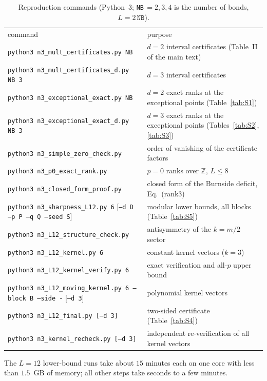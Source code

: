 \documentclass[aps,prx,reprint,superscriptaddress,nobibnotes,longbibliography]{revtex4-2}
\begin{document}
\begin{table}[t]
\caption{Reproduction commands (Python~3; \texttt{NB}$\,=2,3,4$ is the number of bonds, $L=2\,\texttt{NB}$).}
\label{tab:S9}
\footnotesize
\begin{ruledtabular}
\begin{tabular}{ll}
command & purpose\\
\colrule
\texttt{python3 n3\_mult\_certificates.py NB} & $d=2$ interval certificates (Table~II of the main text)\\
\texttt{python3 n3\_mult\_certificates\_d.py NB 3} & $d=3$ interval certificates\\
\texttt{python3 n3\_exceptional\_exact.py NB} & $d=2$ exact ranks at the exceptional points (Table~\ref{tab:S1})\\
\texttt{python3 n3\_exceptional\_exact\_d.py NB 3} & $d=3$ exact ranks at the exceptional points (Tables~\ref{tab:S2}, \ref{tab:S3})\\
\texttt{python3 n3\_simple\_zero\_check.py} & order of vanishing of the certificate factors\\
\texttt{python3 n3\_p0\_exact\_rank.py} & $p=0$ ranks over $\mathbb Z$, $L\le8$\\
\texttt{python3 n3\_closed\_form\_proof.py} & closed form of the Burnside deficit, Eq.~(rank3)\\
\texttt{python3 n3\_sharpness\_L12.py 6} [\texttt{--d D --p P --q Q --seed S}] & modular lower bounds, all blocks (Table~\ref{tab:S5})\\
\texttt{python3 n3\_L12\_structure\_check.py} & antisymmetry of the $k=m/2$ sector\\
\texttt{python3 n3\_L12\_kernel.py 6} & constant kernel vectors ($k=3$)\\
\texttt{python3 n3\_L12\_kernel\_verify.py 6} & exact verification and all-$p$ upper bound\\
\texttt{python3 n3\_L12\_moving\_kernel.py 6 --block B --side -} [\texttt{--d 3}] & polynomial kernel vectors\\
\texttt{python3 n3\_L12\_final.py [--d 3]} & two-sided certificate (Table~\ref{tab:S4})\\
\texttt{python3 n3\_kernel\_recheck.py [--d 3]} & independent re-verification of all kernel vectors\\
\end{tabular}
\end{ruledtabular}
\end{table}
The $L=12$ lower-bound runs take about $15$ minutes each on one core with less than $1.5$~GB of memory; all other steps take seconds to a few minutes.
\end{document}
